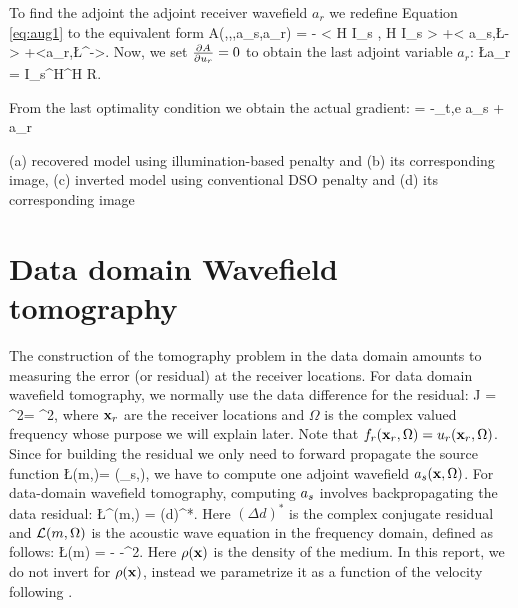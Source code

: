 To find the adjoint the adjoint receiver wavefield $a_r$ we redefine  Equation \ref{eq:aug1}  to 
the equivalent form
\beq
    A(\m,\us,\ur,a_s,a_r) = - < H I_s \ur, H I_s \ur> +< a_s,\L\us-\fs> +<a_r,\L^\top\ur-\fr>.
\eeq
Now, we set $\frac{\partial A }{\partial {u_r}}=0$ to obtain the last adjoint variable $a_r$:
\beq
   \L a_r = I_s^\top H^\top H R.
\eeq

From the last optimality condition we obtain the actual gradient:
\beq
  =  -\sum_{t,e}  a_s + a_r
\eeq

%
{(a) recovered model using illumination-based penalty and (b) its corresponding image, (c) inverted model using conventional DSO penalty and (d) its corresponding image}



\section{Data domain Wavefield tomography}
The construction of the tomography problem in the data domain amounts to measuring the error
(or residual) at the receiver locations. For data domain wavefield tomography, we normally
 use the data difference for the residual:
\beq
J =  ^2= ^2,
\label{eq:offwi}
\eeq
where ${\bf x}_r$ are the receiver locations and $\Omega$ is the complex valued frequency whose
purpose we will explain later. Note that ${f_r}({\bf x}_r,\Omega) = u_r({\bf x}_r,\Omega)$.
Since for building the residual we only need to forward propagate the source function 
\beq
\L({m},\Omega)\US = \fs(\xx_s,\Omega),
\eeq
 we have to compute one adjoint wavefield ${a_s}({\bf x},\Omega)$.
For data-domain wavefield tomography, computing ${a_s}$ involves backpropagating the data residual:
\beq
  \L^\top({m},\Omega) \as = (\Delta d)^{*}.
\eeq
Here $(\Delta d)^{*}$ is the complex conjugate residual and $\mathcal{L}({m},\Omega)$ is the acoustic wave 
equation in the frequency domain, defined as follows:
\beq
  \L(m) = - -\Omega^2.
\label{eq:time_we}
\eeq
Here $\rho({\bf x})$ is the density of the medium. In this report, we do not invert for $\rho({\bf x})$, instead
we parametrize it as a function of the velocity following \cite{Gardner}.


